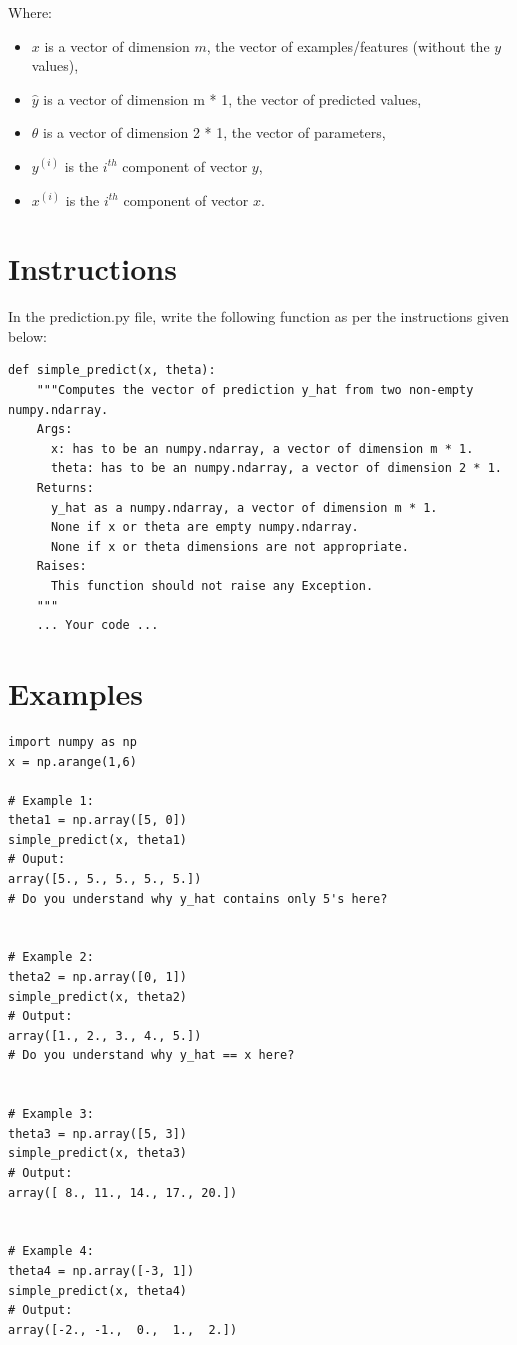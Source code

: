 \documentclass{42-en}
\begin{document}
Where:
\begin{itemize}
  \item $x$ is a vector of dimension $m$, the vector of examples/features (without the $y$ values),
  \item $\hat{y}$ is a vector of dimension m * 1, the vector of predicted values,
  \item $\theta$ is a vector of dimension 2 * 1, the vector of parameters,
  \item $y^{(i)}$ is the $i^{th}$ component of vector $y$,
  \item $x^{(i)}$ is the $i^{th}$ component of vector $x$.
\end{itemize}

\section*{Instructions}
In the prediction.py file, write the following function as per the instructions given below:

\begin{verbatim}
def simple_predict(x, theta):
    """Computes the vector of prediction y_hat from two non-empty numpy.ndarray.
    Args:
      x: has to be an numpy.ndarray, a vector of dimension m * 1.
      theta: has to be an numpy.ndarray, a vector of dimension 2 * 1.
    Returns:
      y_hat as a numpy.ndarray, a vector of dimension m * 1.
      None if x or theta are empty numpy.ndarray.
      None if x or theta dimensions are not appropriate.
    Raises:
      This function should not raise any Exception.
    """
    ... Your code ...
\end{verbatim}

\section*{Examples}
\begin{verbatim}
import numpy as np
x = np.arange(1,6)

# Example 1:
theta1 = np.array([5, 0])
simple_predict(x, theta1)
# Ouput:
array([5., 5., 5., 5., 5.])
# Do you understand why y_hat contains only 5's here?  


# Example 2:
theta2 = np.array([0, 1])
simple_predict(x, theta2)
# Output:
array([1., 2., 3., 4., 5.])
# Do you understand why y_hat == x here?  


# Example 3:
theta3 = np.array([5, 3])
simple_predict(x, theta3)
# Output:
array([ 8., 11., 14., 17., 20.])


# Example 4:
theta4 = np.array([-3, 1])
simple_predict(x, theta4)
# Output:
array([-2., -1.,  0.,  1.,  2.])  
\end{verbatim}
\end{document}
